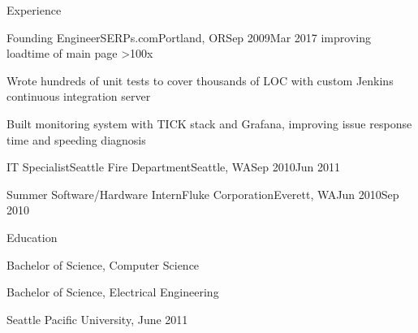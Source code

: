 \documentclass[letterpaper,12pt]{article}
\begin{document}
\begin{paracol}{2}
\begin{rsection}{Experience}
\begin{rexperienceitem}{Founding Engineer}{SERPs.com}{Portland, OR}{Sep 2009}{Mar 2017}
        improving loadtime of main page \textgreater100x
  \item Wrote hundreds of unit tests to cover thousands of LOC with custom Jenkins continuous integration server
  \item Built monitoring system with TICK stack and Grafana, improving issue response time and speeding diagnosis
\end{rexperienceitem}
\begin{rexperience}{IT Specialist}{Seattle Fire Department}{Seattle, WA}{Sep 2010}{Jun 2011}
\end{rexperience}
\begin{rexperience}{Summer Software/Hardware Intern}{Fluke Corporation}{Everett, WA}{Jun 2010}{Sep 2010}
\end{rexperience}
\end{rsection}

\begin{rsection}{Education}
\begin{rcontent}{Bachelor of Science, Computer Science

  \noindent Bachelor of Science, Electrical Engineering

  \textnormal{%
      \sffamily
      \normalsize
      \hfill
      Seattle Pacific University, June 2011}
}
\end{rcontent}
\end{rsection}


\end{paracol}
\end{document}
